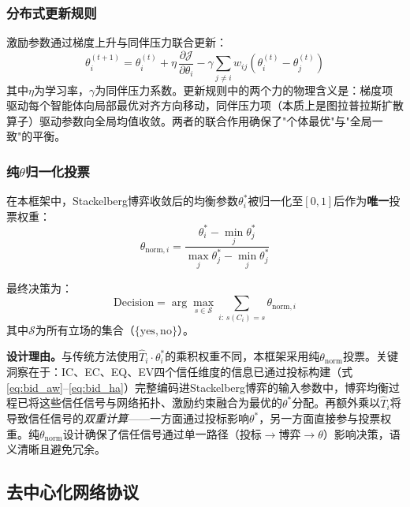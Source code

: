 \documentclass[12pt,a4paper,UTF8,fontset=fandol]{ctexart}
\begin{document}
\subsubsection{分布式更新规则}

激励参数通过梯度上升与同伴压力联合更新：
\begin{equation}\label{eq:theta_update}
\theta_i^{(t+1)} = \theta_i^{(t)} + \eta\,\frac{\partial \mathcal{J}}{\partial \theta_i} - \gamma \sum_{j \neq i} w_{ij}(\theta_i^{(t)} - \theta_j^{(t)})
\end{equation}
其中$\eta$为学习率，$\gamma$为同伴压力系数。更新规则中的两个力的物理含义是：梯度项驱动每个智能体向局部最优对齐方向移动，同伴压力项（本质上是图拉普拉斯扩散算子）驱动参数向全局均值收敛。两者的联合作用确保了"个体最优"与"全局一致"的平衡。

\subsubsection{纯$\theta$归一化投票}

在本框架中，Stackelberg博弈收敛后的均衡参数$\theta_i^*$被归一化至$[0,1]$后作为\textbf{唯一}投票权重：
\begin{equation}\label{eq:theta_norm}
\theta_{\text{norm},i} = \frac{\theta_i^* - \min_j \theta_j^*}{\max_j \theta_j^* - \min_j \theta_j^*}
\end{equation}

最终决策为：
\begin{equation}\label{eq:decision}
\text{Decision} = \arg\max_{s \in \mathcal{S}} \sum_{i:\, s(C_i)=s} \theta_{\text{norm},i}
\end{equation}
其中$\mathcal{S}$为所有立场的集合（$\{\text{yes}, \text{no}\}$）。

\textbf{设计理由。}与传统方法使用$\hat{T}_i \cdot \theta_i^*$的乘积权重不同，本框架采用纯$\theta_{\text{norm}}$投票。关键洞察在于：IC、EC、EQ、EV四个信任维度的信息已通过投标构建（式\eqref{eq:bid_aw}--\eqref{eq:bid_ha}）完整编码进Stackelberg博弈的输入参数中，博弈均衡过程已将这些信任信号与网络拓扑、激励约束融合为最优的$\theta^*$分配。再额外乘以$\hat{T}_i$将导致信任信号的\textit{双重计算}——一方面通过投标影响$\theta^*$，另一方面直接参与投票权重。纯$\theta_{\text{norm}}$设计确保了信任信号通过单一路径（投标$\to$博弈$\to\theta$）影响决策，语义清晰且避免冗余。

\subsection{去中心化网络协议}\label{sec:network}
\end{document}
